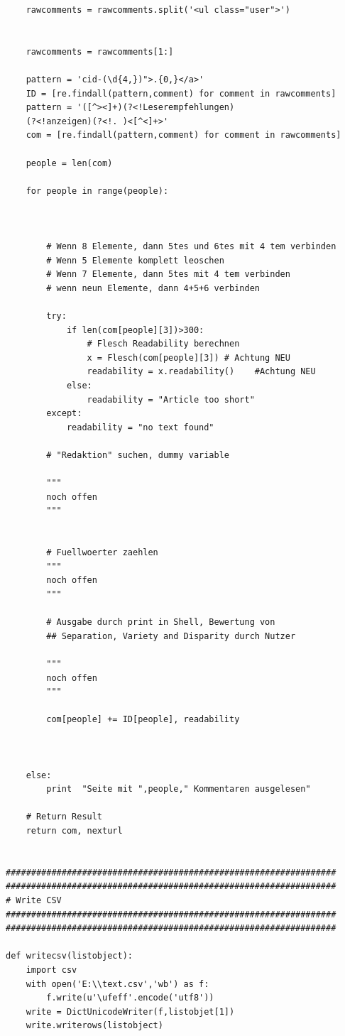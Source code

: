 \documentclass[12pt,a4paper,oneside]{article}
\begin{document}
\begin{titlepage}
\begin{flushleft}
\begin{verbatim}
    rawcomments = rawcomments.split('<ul class="user">')
        
    
    rawcomments = rawcomments[1:]
 
    pattern = 'cid-(\d{4,})">.{0,}</a>'
    ID = [re.findall(pattern,comment) for comment in rawcomments]
    pattern = '([^><]+)(?<!Leserempfehlungen)
    (?<!anzeigen)(?<!. )<[^<]+>'
    com = [re.findall(pattern,comment) for comment in rawcomments]

    people = len(com)
    
    for people in range(people):

                 
        
        # Wenn 8 Elemente, dann 5tes und 6tes mit 4 tem verbinden
        # Wenn 5 Elemente komplett leoschen
        # Wenn 7 Elemente, dann 5tes mit 4 tem verbinden
        # wenn neun Elemente, dann 4+5+6 verbinden
        
        try:
            if len(com[people][3])>300:
                # Flesch Readability berechnen
                x = Flesch(com[people][3]) # Achtung NEU
                readability = x.readability()    #Achtung NEU               
            else:
                readability = "Article too short"
        except:
            readability = "no text found"

        # "Redaktion" suchen, dummy variable

        """
        noch offen
        """
                            

        # Fuellwoerter zaehlen
        """
        noch offen
        """

        # Ausgabe durch print in Shell, Bewertung von
        ## Separation, Variety and Disparity durch Nutzer

        """
        noch offen
        """

        com[people] += ID[people], readability
 
            
   
    else:
        print  "Seite mit ",people," Kommentaren ausgelesen"

    # Return Result
    return com, nexturl


#################################################################
#################################################################
# Write CSV
#################################################################
#################################################################

def writecsv(listobject):
    import csv
    with open('E:\\text.csv','wb') as f:
        f.write(u'\ufeff'.encode('utf8'))
	write = DictUnicodeWriter(f,listobjet[1])
	write.writerows(listobject)


\end{verbatim}
\end{flushleft}
\end{titlepage}
\end{document}
